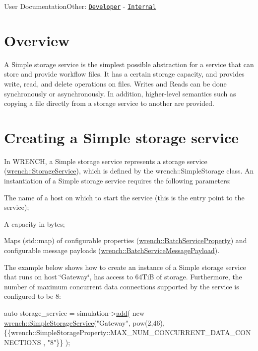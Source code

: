 User DocumentationOther\+: \href{../developer/wrench-101.html}{\tt Developer} -\/ \href{../internal/wrench-101.html}{\tt Internal}\hypertarget{guide-simplestorage_guide-simplestorage-overview}{}\section{Overview}\label{guide-simplestorage_guide-simplestorage-overview}
A Simple storage service is the simplest possible abstraction for a service that can store and provide workflow files. It has a certain storage capacity, and provides write, read, and delete operations on files. Writes and Reads can be done synchronously or asynchronously. In addition, higher-\/level semantics such as copying a file directly from a storage service to another are provided.\hypertarget{guide-simplestorage_guide-simplestorage-creating}{}\section{Creating a Simple storage service}\label{guide-simplestorage_guide-simplestorage-creating}
In W\+R\+E\+N\+CH, a Simple storage service represents a storage service ({\ttfamily \hyperlink{classwrench_1_1_storage_service}{wrench\+::\+Storage\+Service}}), which is defined by the {\ttfamily wrench\+::\+Simple\+Storage} class. An instantiation of a Simple storage service requires the following parameters\+:


\begin{DoxyItemize}
\item The name of a host on which to start the service (this is the entry point to the service);
\item A capacity in bytes;
\item Maps ({\ttfamily std\+::map}) of configurable properties ({\ttfamily \hyperlink{classwrench_1_1_batch_service_property}{wrench\+::\+Batch\+Service\+Property}}) and configurable message payloads ({\ttfamily \hyperlink{classwrench_1_1_batch_service_message_payload}{wrench\+::\+Batch\+Service\+Message\+Payload}}).
\end{DoxyItemize}

The example below shows how to create an instance of a Simple storage service that runs on host \char`\"{}\+Gateway\char`\"{}, has access to 64\+TiB of storage. Furthermore, the number of maximum concurrent data connections supported by the service is configured to be 8\+:


\begin{DoxyCode}
\textcolor{keyword}{auto} storage\_service = simulation->\hyperlink{classwrench_1_1_simulation_ad1f5c12285ecfaf5a2ce7dab5ec8b4c5}{add}(
          \textcolor{keyword}{new} \hyperlink{classwrench_1_1_simple_storage_service}{wrench::SimpleStorageService}(\textcolor{stringliteral}{"Gateway"}, 
                                  pow(2,46),
                                       \{\{wrench::SimpleStorageProperty::MAX\_NUM\_CONCURRENT\_DATA\_CONNECTIONS
      , \textcolor{stringliteral}{"8"}\}\}
                                      );
\end{DoxyCode}
 